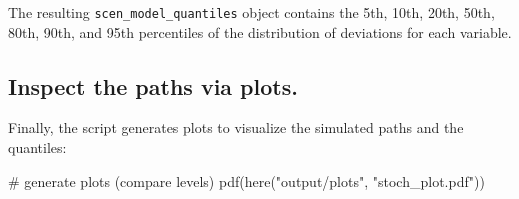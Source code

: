 \documentclass[
  letterpaper,
  DIV=11,
  numbers=noendperiod]{scrreport}
\newenvironment{Shaded}{\begin{snugshade}}{\end{snugshade}}
\newcommand{\CommentTok}[1]{\textcolor[rgb]{0.37,0.37,0.37}{#1}}
\newcommand{\FunctionTok}[1]{\textcolor[rgb]{0.28,0.35,0.67}{#1}}
\newcommand{\NormalTok}[1]{\textcolor[rgb]{0.00,0.23,0.31}{#1}}
\newcommand{\StringTok}[1]{\textcolor[rgb]{0.13,0.47,0.30}{#1}}
\begin{document}
The resulting \texttt{scen\_model\_quantiles} object contains the 5th,
10th, 20th, 50th, 80th, 90th, and 95th percentiles of the distribution
of deviations for each variable.

\subsection{Inspect the paths via
plots.}\label{inspect-the-paths-via-plots.}

Finally, the script generates plots to visualize the simulated paths and
the quantiles:

\begin{Shaded}
\begin{Highlighting}[]
\CommentTok{\# generate plots (compare levels)}
\FunctionTok{pdf}\NormalTok{(}\FunctionTok{here}\NormalTok{(}\StringTok{"output/plots"}\NormalTok{, }\StringTok{"stoch\_plot.pdf"}\NormalTok{))}


\end{Highlighting}
\end{Shaded}
\end{document}
